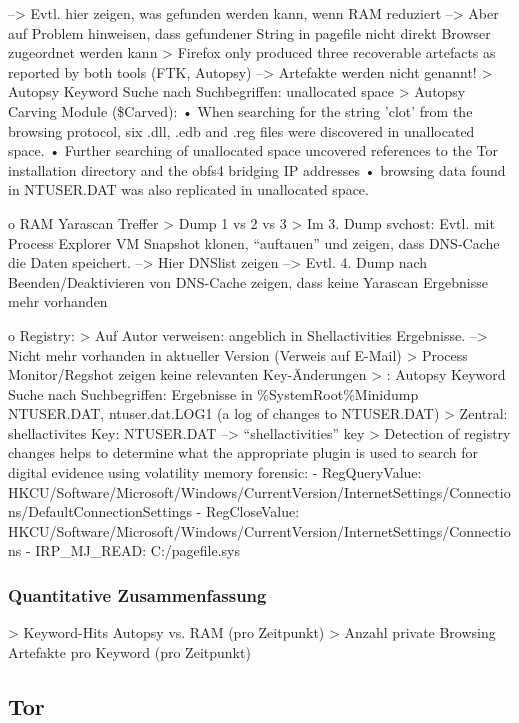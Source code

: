 	--> Evtl. hier zeigen, was gefunden werden kann, wenn RAM reduziert
	--> Aber auf Problem hinweisen, dass gefundener String in pagefile nicht direkt Browser zugeordnet werden kann
	> \cite{Gabet.2018}	Firefox only produced three recoverable artefacts as reported by both tools (FTK, Autopsy) --> Artefakte werden nicht genannt!
	> \cite{Muir.2019} Autopsy Keyword Suche nach Suchbegriffen: unallocated space
	> Autopsy Carving Module (\$Carved): \cite{Muir.2019}
		•	When searching for the string ’clot’ from the browsing protocol, six .dll, .edb and .reg files were discovered in unallocated space.
		•	Further searching of unallocated space uncovered references to the Tor installation directory and the obfs4 bridging IP addresses
		•	browsing data found in NTUSER.DAT was also replicated in unallocated space.
	
	
o	RAM Yarascan Treffer
	>	Dump 1 vs 2 vs 3 
	>	Im 3. Dump svchost: Evtl. mit Process Explorer VM Snapshot klonen, “auftauen” und zeigen, dass DNS-Cache die Daten speichert. 
	-->	Hier DNSlist zeigen
	-->	Evtl. 4. Dump nach Beenden/Deaktivieren von DNS-Cache zeigen, dass keine Yarascan Ergebnisse mehr vorhanden
	
o	Registry:
	>	Auf Autor verweisen: angeblich in Shellactivities Ergebnisse. --> Nicht mehr vorhanden in aktueller Version (Verweis auf E-Mail)
	>	Process Monitor/Regshot zeigen keine relevanten Key-Änderungen
	> \cite{Muir.2019}: Autopsy Keyword Suche nach Suchbegriffen: Ergebnisse in \%SystemRoot\%Minidump NTUSER.DAT, ntuser.dat.LOG1 (a log of changes to NTUSER.DAT)
	> Zentral: shellactivites Key:	NTUSER.DAT --> “shellactivities” key \cite{Muir.2019}
	> \cite{Rochmadi.2017} Detection of registry changes helps to determine what the appropriate plugin is used to search for digital evidence using volatility memory forensic:
		- RegQueryValue:	HKCU/Software/Microsoft/Windows/CurrentVersion/InternetSettings/Connections/DefaultConnectionSettings
		- RegCloseValue: 	HKCU/Software/Microsoft/Windows/CurrentVersion/InternetSettings/Connections
		- IRP\_MJ\_READ: C:/pagefile.sys
		
		
\subsubsection*{Quantitative Zusammenfassung}
>	Keyword-Hits Autopsy vs. RAM (pro Zeitpunkt)
>	Anzahl private Browsing Artefakte pro Keyword (pro Zeitpunkt)


\subsection{Tor}

